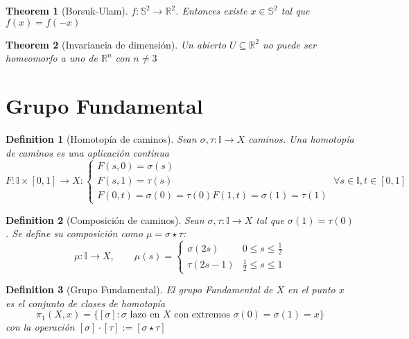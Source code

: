 \documentclass{myclass}
\newtheorem*{definition}{Definition}
\newtheorem*{theorem}{Theorem}
\begin{document}
\begin{theorem}[Borsuk-Ulam]
$f: \mathbb{S}^2 \to \mathbb{R}^2 $. Entonces existe $x \in \mathbb{S}^2$ tal que $f(x) = f(-x)$
\end{theorem}

\begin{theorem}[Invariancia de dimensión]
Un abierto $U\subseteq \mathbb{R}^2$ no puede ser homeomorfo a uno de $\mathbb{R}^n$ con $n\neq 3$
\end{theorem}



\section{Grupo Fundamental}
\begin{definition}[Homotopía de caminos]
  Sean $\sigma , \tau : \mathbb{I} \to X$ caminos. Una homotopía de caminos es una aplicación continua 
  \[
  F:\mathbb{I}\times [0, 1] \to  X : \begin{cases}
    F(s, 0) = \sigma (s) \\
	F(s, 1) = \tau (s) \\
    F(0, t) = \sigma(0) = \tau (0)
    F(1, t) = \sigma(1) = \tau (1)
  \end{cases} \ \forall s \in \mathbb{I}, t \in [0,1]
  \] 
\end{definition}

\begin{definition}[Composición de caminos] Sean $\sigma , \tau : \mathbb{I} \to X $ tal que $\sigma (1) = \tau (0)$. Se define su composición como $\mu = \sigma \star \tau $:
  \[
  \mu: \mathbb{I} \to X, \qquad \mu(s) = \begin{cases}
	\sigma (2s) & 0\le s\le \frac{1}{2} \\
	\tau (2s-1) & \frac{1}{2} \le s\le 1
  \end{cases}
  \] 

\end{definition}

\begin{definition}[Grupo Fundamental]
  El grupo Fundamental de $X$ en el punto $x$ es el conjunto de clases de homotopía
  \[
  \pi_1(X, x) = \{[\sigma ] : \sigma \text{ lazo en } X \text{ con extremos } \sigma (0) = \sigma (1)=x\}
  \] 
  con la operación $[\sigma ]\cdot [\tau ] := [\sigma \star \tau ]$
\end{definition}
\end{document}
